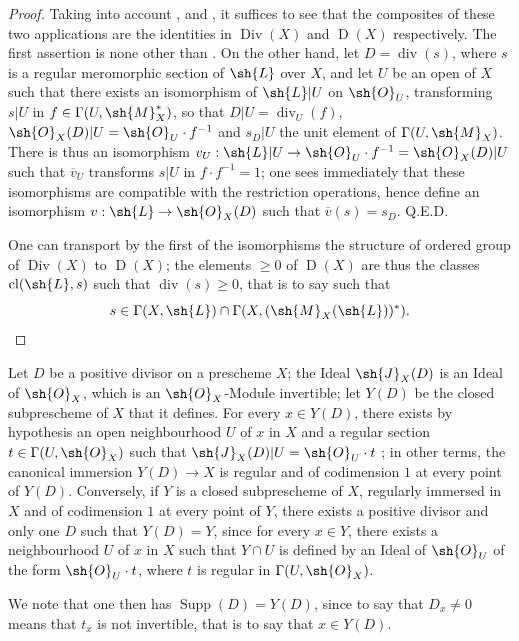 \begin{proof}
Taking into account ,  and , it suffices to see that the composites of these two applications are the identities in $\operatorname{Div}(X)$ and $\operatorname{D}(X)$ respectively.
The first assertion is none other than .
On the other hand, let $D=\operatorname{div}(s)$, where $s$ is a regular meromorphic section of $\sh{L}$ over $X$, and let $U$ be an open of $X$ such that there exists an isomorphism of $\sh{L}|U$ on $\sh{O}_U$, transforming $s|U$ in $f\in\Gamma(U,\sh{M}_X^*)$, so that $D|U=\operatorname{div}_U(f)$, $\sh{O}_X(D)|U=\sh{O}_U\cdot f^{-1}$ and $s_D|U$ the unit element of $\Gamma(U,\sh{M}_X)$.
There is thus an isomorphism $v_U:\sh{L}|U\to\sh{O}_U\cdot f^{-1}=\sh{O}_X(D)|U$ such that $\overline{v}_U$ transforms $s|U$ in $f\cdot f^{-1}=1$;
one sees immediately that these isomorphisms are compatible with the restriction operations, hence define an isomorphism $v:\sh{L}\to\sh{O}_X(D)$ such that $\overline{v}(s)=s_D$.
Q.E.D.

One can transport by the first of the isomorphisms  the structure of ordered group of $\operatorname{Div}(X)$ to $\operatorname{D}(X)$;
the elements $\geq 0$ of $\operatorname{D}(X)$ are thus the classes $\operatorname{cl}(\sh{L},s)$ such that $\operatorname{div}(s)\geq 0$, that is to say  such that
\[
  s\in\Gamma(X,\sh{L})\cap\Gamma(X,(\sh{M}_X(\sh{L}))^*).
\]
\end{proof}

\begin{env}[21.2.12]
\label{IV.21.2.12}
Let $D$ be a positive divisor on a prescheme $X$;
the Ideal $\sh{J}_X(D)$ is an Ideal of $\sh{O}_X$, which is an $\sh{O}_X$-Module invertible;
let $Y(D)$ be the closed subprescheme of $X$ that it defines.
For every $x\in Y(D)$, there exists by hypothesis an open neighbourhood $U$ of $x$ in $X$ and a regular section $t\in\Gamma(U,\sh{O}_X)$ such that $\sh{J}_X(D)|U=\sh{O}_U\cdot t$ ;
in other terms, the canonical immersion $Y(D)\to X$ is regular and of codimension $1$  at every point of $Y(D)$.
Conversely, if $Y$ is a closed subprescheme of $X$, regularly immersed in $X$ and of codimension $1$ at every point of $Y$, there exists a positive divisor and only one $D$ such that $Y(D)=Y$, since for every $x\in Y$, there exists a neighbourhood $U$ of $x$ in $X$ such that $Y\cap U$ is defined by an Ideal of $\sh{O}_U$ of the form $\sh{O}_U\cdot t$, where $t$ is regular in $\Gamma(U,\sh{O}_X)$.

We note that one then has $\operatorname{Supp}(D)=Y(D)$, since to say that $D_x\neq 0$ means that $t_x$ is not invertible, that is to say that $x\in Y(D)$.
\end{env}

